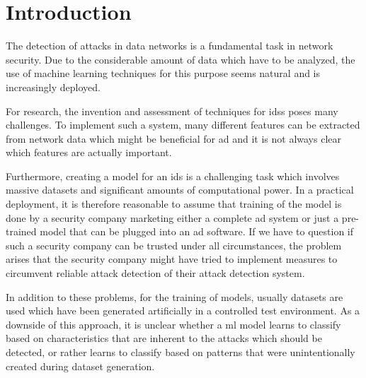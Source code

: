 \documentclass[10pt,sigconf,letterpaper,dvipsnames]{acmart}
\begin{document}

\maketitle

\section{Introduction}
The detection of attacks in data networks is a fundamental task in network security. Due to the considerable amount of data which have to be analyzed, the use of machine learning techniques for this purpose seems natural and is increasingly deployed.

For research, the invention and assessment of techniques for \glspl{ids} poses many challenges. To implement such a system, many different features can be extracted from network data which might be beneficial for \gls{ad} and it is not always clear which features are actually important.

Furthermore, creating a model for an \gls{ids} is a challenging task which involves massive datasets and significant amounts of computational power. In a practical deployment, it is therefore reasonable to assume that training of the model is done by a security company marketing either a complete \gls{ad} system or just a pre-trained model that can be plugged into an \gls{ad} software.%
If we have to question if such a security company can be trusted under all circumstances, the problem arises that the security company might have tried to implement measures to circumvent reliable attack detection of their attack detection system.

In addition to these problems, for the training of models, usually datasets are used which have been generated artificially in a controlled test environment. As a downside of this approach, it is unclear whether a \gls{ml} model learns to classify based on characteristics that are inherent to the attacks which should be detected, or rather learns to classify based on patterns that were unintentionally created during dataset generation.
\end{document}
